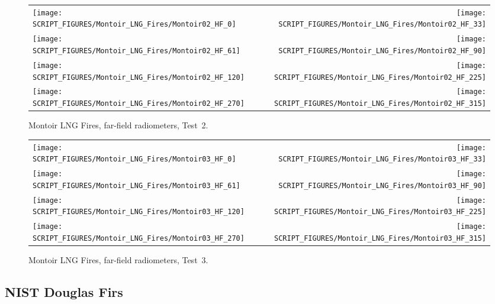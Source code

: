 \begin{figure}[p]
\begin{tabular*}{\textwidth}{l@{\extracolsep{\fill}}r}
\texttt{[image: SCRIPT\_FIGURES/Montoir\_LNG\_Fires/Montoir02\_HF\_0]} &
\texttt{[image: SCRIPT\_FIGURES/Montoir\_LNG\_Fires/Montoir02\_HF\_33]} \\
\texttt{[image: SCRIPT\_FIGURES/Montoir\_LNG\_Fires/Montoir02\_HF\_61]} &
\texttt{[image: SCRIPT\_FIGURES/Montoir\_LNG\_Fires/Montoir02\_HF\_90]} \\
\texttt{[image: SCRIPT\_FIGURES/Montoir\_LNG\_Fires/Montoir02\_HF\_120]} &
\texttt{[image: SCRIPT\_FIGURES/Montoir\_LNG\_Fires/Montoir02\_HF\_225]} \\
\texttt{[image: SCRIPT\_FIGURES/Montoir\_LNG\_Fires/Montoir02\_HF\_270]} &
\texttt{[image: SCRIPT\_FIGURES/Montoir\_LNG\_Fires/Montoir02\_HF\_315]}
\end{tabular*}
\caption[Montoir LNG Fires, far-field radiometers, Test~2]{Montoir LNG Fires, far-field radiometers, Test~2.}
\label{Montoir_HF_2}
\end{figure}

\begin{figure}[p]
\begin{tabular*}{\textwidth}{l@{\extracolsep{\fill}}r}
\texttt{[image: SCRIPT\_FIGURES/Montoir\_LNG\_Fires/Montoir03\_HF\_0]} &
\texttt{[image: SCRIPT\_FIGURES/Montoir\_LNG\_Fires/Montoir03\_HF\_33]} \\
\texttt{[image: SCRIPT\_FIGURES/Montoir\_LNG\_Fires/Montoir03\_HF\_61]} &
\texttt{[image: SCRIPT\_FIGURES/Montoir\_LNG\_Fires/Montoir03\_HF\_90]} \\
\texttt{[image: SCRIPT\_FIGURES/Montoir\_LNG\_Fires/Montoir03\_HF\_120]} &
\texttt{[image: SCRIPT\_FIGURES/Montoir\_LNG\_Fires/Montoir03\_HF\_225]} \\
\texttt{[image: SCRIPT\_FIGURES/Montoir\_LNG\_Fires/Montoir03\_HF\_270]} &
\texttt{[image: SCRIPT\_FIGURES/Montoir\_LNG\_Fires/Montoir03\_HF\_315]}
\end{tabular*}
\caption[Montoir LNG Fires, far-field radiometers, Test~3]{Montoir LNG Fires, far-field radiometers, Test~3.}
\label{Montoir_HF_3}
\end{figure}



\clearpage

\subsection{NIST Douglas Firs}
\label{Douglas_Firs_Heat_Flux}

